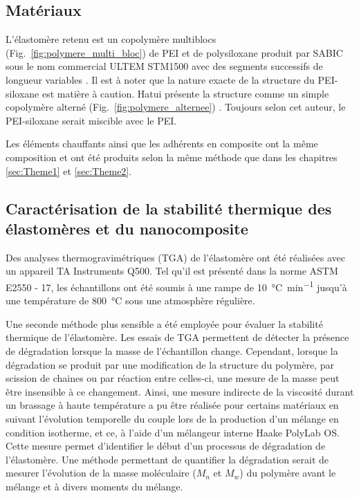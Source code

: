 \subsection{Matériaux}

L'élastomère retenu est un copolymère multiblocs (Fig.~\ref{fig:polymere_multi_bloc}) de PEI et de polysiloxane  produit par SABIC sous le nom commercial ULTEM STM1500 avec des segments successifs de longueur variables  \cite{mark2013,Holden2002}. 
Il est à noter que la nature exacte de la structure du PEI-siloxane est matière à caution. 
Hatui présente la structure comme un simple copolymère alterné (Fig.~\ref{fig:polymere_alternee}) \cite{Hatui2015}. 
Toujours selon cet auteur, le PEI-siloxane serait miscible avec le PEI. 

Les éléments chauffants ainsi que les adhérents en composite ont la même composition et ont été produits selon la même méthode que dans les chapitres \ref{sec:Theme1} et \ref{sec:Theme2}. 

\subsection{Caractérisation de la stabilité thermique des élastomères et du nanocomposite}

Des analyses thermogravimétriques (TGA) de l'élastomère ont été réalisées avec un appareil TA Instruments Q500. 
Tel qu'il est présenté dans la norme ASTM E2550 - 17, les échantillons ont été soumis à une rampe de \SI[locale=FR]{10}{\celsius\per\minute} jusqu'à une température de \SI[locale=FR]{800}{\celsius} sous une atmosphère régulière. 

Une seconde méthode plus sensible a été employée pour évaluer la stabilité thermique de l'élastomère. 
Les essais de TGA permettent de détecter la présence de dégradation lorsque la masse de l'échantillon change. 
Cependant, lorsque la dégradation se produit par une modification de la structure du polymère, par scission de chaines ou par réaction entre celles-ci, une mesure de la masse peut être insensible à ce changement. 
Ainsi, une mesure indirecte de la viscosité durant un brassage à haute température a pu être réalisée pour certains matériaux en suivant l'évolution temporelle du couple lors de la production d'un mélange en condition isotherme, et ce, à l'aide d'un mélangeur interne Haake PolyLab OS. 
Cette mesure permet d'identifier le début d'un processus de dégradation de l'élastomère. 
Une méthode permettant de quantifier la dégradation serait de mesurer l'évolution de la masse moléculaire ($M_n$ et $M_w$) du polymère avant le mélange et à divers moments du mélange. 

